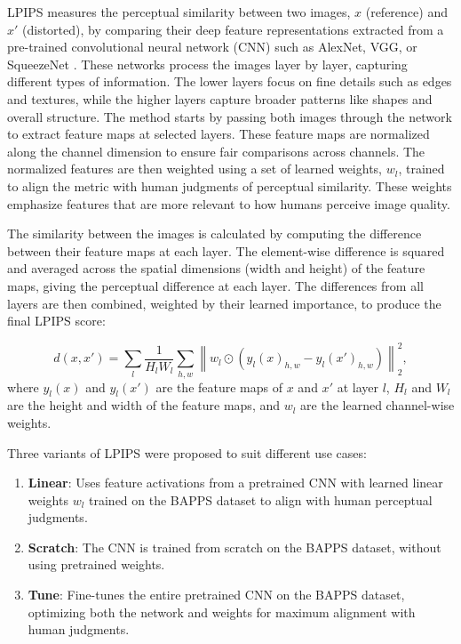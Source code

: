 \documentclass[a4paper,12pt]{article}
\begin{document}
LPIPS measures the perceptual similarity between two images, \(x\) (reference) and \(x'\) (distorted), by comparing their deep feature representations extracted from a pre-trained convolutional neural network (CNN) such as AlexNet, VGG, or SqueezeNet \cite{zhang_unreasonable_2018}. These networks process the images layer by layer, capturing different types of information. The lower layers focus on fine details such as edges and textures, while the higher layers capture broader patterns like shapes and overall structure. The method starts by passing both images through the network to extract feature maps at selected layers. These feature maps are normalized along the channel dimension to ensure fair comparisons across channels. The normalized features are then weighted using a set of learned weights, \(w_l\), trained to align the metric with human judgments of perceptual similarity. These weights emphasize features that are more relevant to how humans perceive image quality.

The similarity between the images is calculated by computing the difference between their feature maps at each layer. The element-wise difference is squared and averaged across the spatial dimensions (width and height) of the feature maps, giving the perceptual difference at each layer. The differences from all layers are then combined, weighted by their learned importance, to produce the final LPIPS score:

\[
d(x, x') = \sum_{l} \frac{1}{H_l W_l} \sum_{h,w} \left\| w_l \odot \left( y_l(x)_{h,w} - y_l(x')_{h,w} \right) \right\|_2^2,
\]
where \(y_l(x)\) and \(y_l(x')\) are the feature maps of \(x\) and \(x'\) at layer \(l\), \(H_l\) and \(W_l\) are the height and width of the feature maps, and \(w_l\) are the learned channel-wise weights.

Three variants of LPIPS were proposed to suit different use cases:
\begin{enumerate}
    \item \textbf{Linear}: Uses feature activations from a pretrained CNN with learned linear weights \(w_l\) trained on the BAPPS dataset to align with human perceptual judgments.
    \item \textbf{Scratch}: The CNN is trained from scratch on the BAPPS dataset, without using pretrained weights.
    \item \textbf{Tune}: Fine-tunes the entire pretrained CNN on the BAPPS dataset, optimizing both the network and weights for maximum alignment with human judgments.
\end{enumerate}
\end{document}
